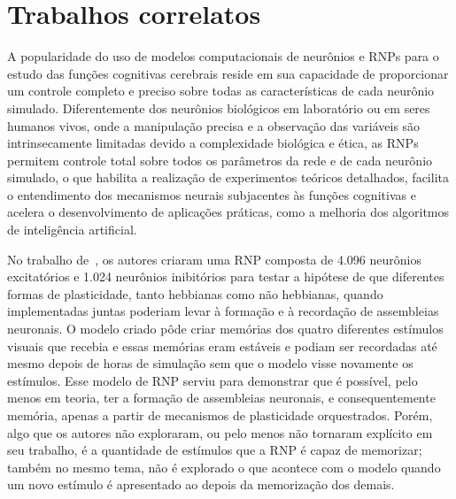 \section{Trabalhos correlatos}

A popularidade do uso de modelos computacionais de neurônios e RNPs para o estudo das funções cognitivas cerebrais reside em sua
capacidade de proporcionar um controle completo e preciso sobre todas as características de cada neurônio simulado. Diferentemente
dos neurônios biológicos em laboratório ou em seres humanos vivos, onde a manipulação precisa e a observação das variáveis são
intrinsecamente limitadas devido a complexidade biológica e ética, as RNPs permitem controle total sobre todos os parâmetros da
rede e de cada neurônio simulado, o que habilita a realização de experimentos teóricos detalhados, facilita o entendimento dos
mecanismos neurais subjacentes às funções cognitivas e acelera o desenvolvimento de aplicações práticas, como a melhoria dos
algoritmos de inteligência artificial. 

No trabalho de~, os autores criaram uma RNP composta de 4.096 neurônios excitatórios e 1.024
neurônios inibitórios para testar a hipótese de que diferentes formas de plasticidade, tanto hebbianas como não hebbianas, quando
implementadas juntas poderiam levar à formação e à recordação de assembleias neuronais. O modelo criado pôde criar memórias dos
quatro diferentes estímulos visuais que recebia e essas memórias eram estáveis e podiam ser recordadas até mesmo depois de horas
de simulação sem que o modelo visse novamente os estímulos. Esse modelo de RNP serviu para demonstrar que é possível, pelo menos
em teoria, ter a formação de assembleias neuronais, e consequentemente memória, apenas a partir de mecanismos de plasticidade
orquestrados. Porém, algo que os autores não exploraram, ou pelo menos não tornaram explícito em seu trabalho, é a quantidade de
estímulos que a RNP é capaz de memorizar; também no mesmo tema, não é explorado o que acontece com o modelo quando um novo
estímulo é apresentado ao depois da memorização dos demais.

